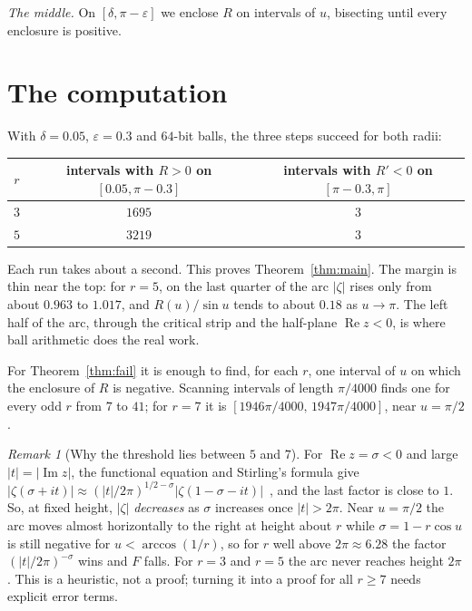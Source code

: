 \documentclass[11pt]{amsart}
\theoremstyle{remark}
\newtheorem{remark}[theorem]{Remark}
\begin{document}
\emph{The middle.} On $[\delta,\pi-\varepsilon]$ we enclose $R$ on intervals of $u$, bisecting until every enclosure is positive.

\section{The computation}

With $\delta=0.05$, $\varepsilon=0.3$ and $64$-bit balls, the three steps succeed for both radii:

\begin{center}
\begin{tabular}{ccc}
\hline
$r$ & intervals with $R>0$ on $[0.05,\pi-0.3]$ & intervals with $R'<0$ on $[\pi-0.3,\pi]$\\
\hline
$3$ & $1695$ & $3$\\
$5$ & $3219$ & $3$\\
\hline
\end{tabular}
\end{center}

\noindent Each run takes about a second. This proves Theorem~\ref{thm:main}. The margin is thin near the top: for $r=5$, on the last quarter of the arc $|\zeta|$ rises only from about $0.963$ to $1.017$, and $R(u)/\sin u$ tends to about $0.18$ as $u\to\pi$. The left half of the arc, through the critical strip and the half-plane $\operatorname{Re}z<0$, is where ball arithmetic does the real work.

For Theorem~\ref{thm:fail} it is enough to find, for each $r$, one interval of $u$ on which the enclosure of $R$ is negative. Scanning intervals of length $\pi/4000$ finds one for every odd $r$ from $7$ to $41$; for $r=7$ it is $[1946\pi/4000,\,1947\pi/4000]$, near $u=\pi/2$.

\begin{remark}[Why the threshold lies between $5$ and $7$]
For $\operatorname{Re}z=\sigma<0$ and large $|t|=|\operatorname{Im}z|$, the functional equation and Stirling's formula give $|\zeta(\sigma+it)|\approx(|t|/2\pi)^{1/2-\sigma}|\zeta(1-\sigma-it)|$~\cite{Titchmarsh}, and the last factor is close to $1$. So, at fixed height, $|\zeta|$ \emph{decreases} as $\sigma$ increases once $|t|>2\pi$. Near $u=\pi/2$ the arc moves almost horizontally to the right at height about $r$ while $\sigma=1-r\cos u$ is still negative for $u<\arccos(1/r)$, so for $r$ well above $2\pi\approx6.28$ the factor $(|t|/2\pi)^{-\sigma}$ wins and $F$ falls. For $r=3$ and $r=5$ the arc never reaches height $2\pi$. This is a heuristic, not a proof; turning it into a proof for all $r\ge7$ needs explicit error terms.
\end{remark}
\end{document}
